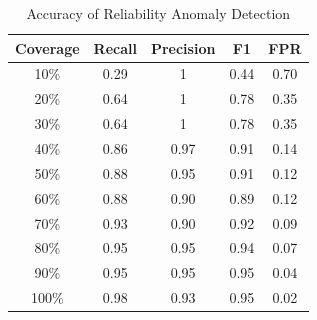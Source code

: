 \begin{table}[ht]
	\newcommand{\tabincell}[2]{\begin{tabular}{@{}#1@{}}#2\end{tabular}}
	\caption{Accuracy of Reliability Anomaly Detection}
	\label{tab:reliability_train}
    \small
	\centering
		\begin{tabular}{|c|c|c|c|c|}
			\hline \textbf{Coverage} & \textbf{Recall} & \textbf{Precision} & \textbf{F1} & \textbf{FPR}\\
			\hline 10\%  &  0.29 & 1    & 0.44 & 0.70 \\
			\hline 20\%  &  0.64 & 1    & 0.78 & 0.35 \\
            \hline 30\%  &  0.64 & 1    & 0.78 & 0.35 \\
			\hline 40\%  &  0.86 & 0.97 & 0.91 & 0.14 \\
			\hline 50\%  &  0.88 & 0.95 & 0.91 & 0.12 \\
            \hline 60\%  &  0.88 & 0.90 & 0.89 & 0.12 \\
			\hline 70\%  &  0.93 & 0.90 & 0.92 & 0.09 \\
			\hline 80\%  &  0.95 & 0.95 & 0.94 & 0.07 \\
            \hline 90\%  &  0.95 & 0.95 & 0.95 & 0.04 \\
            \hline 100\% &  0.98 & 0.93 & 0.95 & 0.02 \\
			\hline
		\end{tabular}
	\vspace{-3pt}
\end{table}


